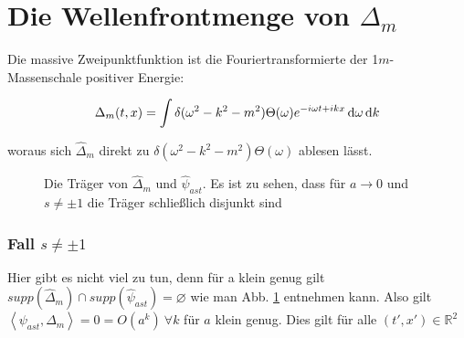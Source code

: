 
\section{\texorpdfstring{Die Wellenfrontmenge von $\Delta_m$}
        {Die Wellenfrontmenge von Delta m}} %
\label{sec:die_wellenfrontmenge_von_delta_m}

Die massive Zweipunktfunktion ist die Fouriertransformierte der 1$m$-Massenschale positiver Energie:

\begin{equation}
    \Delta_m (t,x) = \int \delta (\omega^2-k^2-m^2)
                    \Theta(\omega)e^{-i\omega t + i k x} \mathop{}\!\mathrm{d} \omega \mathop{}\!\mathrm{d} k
\end{equation}

woraus sich $\hat \Delta_m$ direkt zu $\delta (\omega^2-k^2-m^2)\Theta(\omega)$
ablesen lässt.

\begin{figure}[h]
\centering

\caption{Die Träger von $\hat\Delta_m$ und $\hat\psi_{ast}$. Es ist zu sehen, dass für $a \rightarrow 0$ und $s \neq \pm 1$ die Träger schließlich disjunkt sind}
\label{fig:delta_m}
\end{figure}

\subsubsection*{Fall $s \neq \pm 1$}
Hier gibt es nicht viel zu tun, denn für a klein genug gilt
$supp (\hat \Delta_m) \cap supp (\hat \psi_{ast}) = \varnothing$ wie man Abb. \ref{fig:delta_m} entnehmen kann.
Also gilt $\left< \psi_{ast}, \Delta_m\right> = 0 = O(a^k)~ \forall k$ für $a$ klein genug. Dies gilt für alle $(t', x') \in \mathbb{R}^2$


